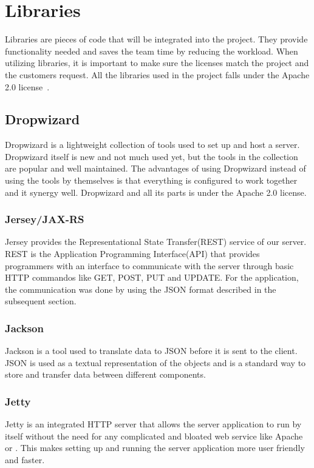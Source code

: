 \section{Libraries}
Libraries are pieces of code that will be integrated into the project. They provide functionality needed and saves the team time by reducing the workload. When utilizing libraries, it is important to make sure the licenses match the project and the customers request. All the libraries used in the project falls under the Apache 2.0 license~\cite{Apache}.

\subsection{Dropwizard}
Dropwizard is a lightweight collection of tools used to set up and host a server. Dropwizard itself is new and not much used yet, but the tools in the collection are popular and well maintained. The advantages of using Dropwizard instead of using the tools by themselves is that everything is configured to work together and it \gls{synergy} well.
Dropwizard and all its parts is under the Apache 2.0 license. 

\subsubsection{Jersey/JAX-RS}
Jersey provides the Representational State Transfer(REST) service of our server. REST is the Application Programming Interface(API) that provides programmers with an interface to communicate with the server through basic HTTP commandos like GET, POST, PUT and UPDATE. For the application, the communication was done by using the JSON format described in the subsequent section.

\subsubsection{Jackson}
Jackson is a tool used to translate data to JSON before it is sent to the client. JSON is used as a textual representation of the objects and is a standard way to store and transfer data between different components.

\subsubsection{Jetty}
Jetty is an integrated HTTP server that allows the server application to run by itself without the need for any  complicated and \gls{bloated} web service like Apache or . This makes setting up and running the server application more user friendly and faster.

